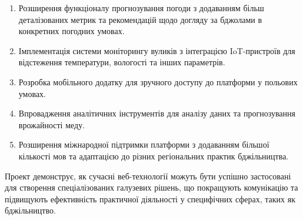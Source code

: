 \begin{enumerate}
    \item Розширення функціоналу прогнозування погоди з додаванням більш деталізованих метрик та рекомендацій щодо догляду за бджолами в конкретних погодних умовах.
    
    \item Імплементація системи моніторингу вуликів з інтеграцією IoT-пристроїв для відстеження температури, вологості та інших параметрів.
    
    \item Розробка мобільного додатку для зручного доступу до платформи у польових умовах.
    
    \item Впровадження аналітичних інструментів для аналізу даних та прогнозування врожайності меду.
    
    \item Розширення міжнародної підтримки платформи з додаванням більшої кількості мов та адаптацією до різних регіональних практик бджільництва.
\end{enumerate}

Проект демонструє, як сучасні веб-технології можуть бути успішно застосовані для створення спеціалізованих галузевих рішень, що покращують комунікацію та підвищують ефективність практичної діяльності у специфічних сферах, таких як бджільництво. 